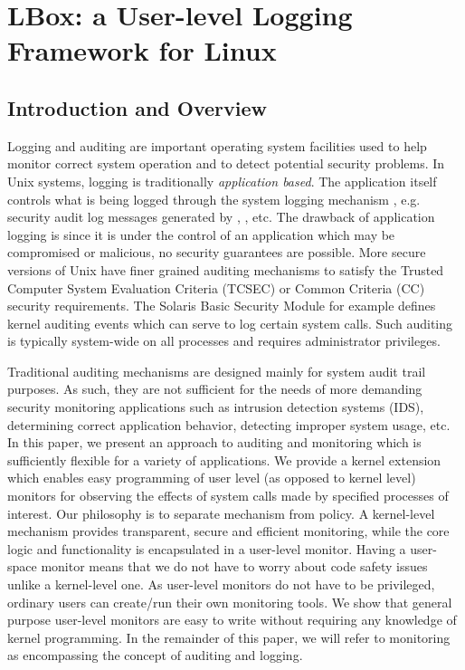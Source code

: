 \chapter{LBox: a User-level Logging Framework for Linux}

\section{Introduction and Overview}


Logging and auditing are important operating system facilities used
to help monitor correct system operation and to detect potential
security problems.
In Unix systems, logging is traditionally {\em application based}.
The application itself controls what is being logged through
the system logging mechanism , e.g.
security audit log messages generated 
by , , etc.
The drawback of application logging is since it is under the
control of an application which may be compromised or malicious,
no security guarantees are possible.
More secure versions of Unix have finer grained auditing mechanisms
to satisfy the Trusted Computer System Evaluation Criteria (TCSEC) or Common
Criteria (CC) security requirements.
The Solaris Basic Security Module \cite{solaris-sec-svc}
for example defines kernel auditing events 
which can serve to log certain system calls.
Such auditing is typically system-wide on all processes and
requires administrator privileges.

Traditional auditing mechanisms are designed mainly for
system audit trail purposes.
As such, they are not sufficient for the needs
of more demanding security monitoring applications
such as intrusion detection systems (IDS), 
determining correct application behavior, detecting improper system usage, etc.
In this paper, we present an approach to auditing and monitoring
which is sufficiently flexible for a variety of applications.
We provide a kernel extension which enables easy
programming of user level (as opposed to kernel level) monitors for 
observing the effects of system calls made by specified processes of interest.
Our philosophy is to separate mechanism from policy.
A kernel-level mechanism provides transparent, secure and efficient monitoring,
while the core logic and functionality is encapsulated in a user-level monitor.
Having a user-space monitor means that
we do not have to worry about code safety
issues unlike a kernel-level one.
As user-level monitors do not have to be privileged, 
ordinary users can create/run their own monitoring tools.
We show that general purpose user-level monitors are easy to write 
without requiring any knowledge of kernel programming. 
In the remainder of this paper, we will refer to monitoring as encompassing
the concept of auditing and logging.

